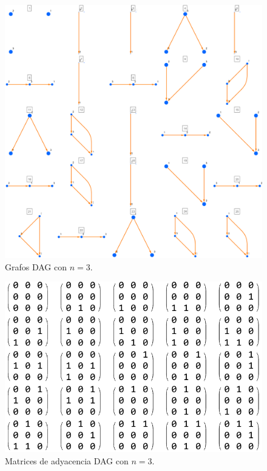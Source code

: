 \documentclass[10pt,a4paper]{article}
\begin{document}
\begin{figure}[h!]
\centering
\includegraphics[scale=0.3]{img/grafosDAG3}
\caption{Grafos DAG con $n=3$.}
\label{fig:resultado3}
\end{figure}

\begin{figure}[h!]
\centering
\includegraphics[scale=0.8]{img/matrixDAG3}
\caption{Matrices de adyacencia DAG con $n=3$.}
\label{fig:resultado4}
\end{figure}

\clearpage
\nocite*
{}

\end{document}
